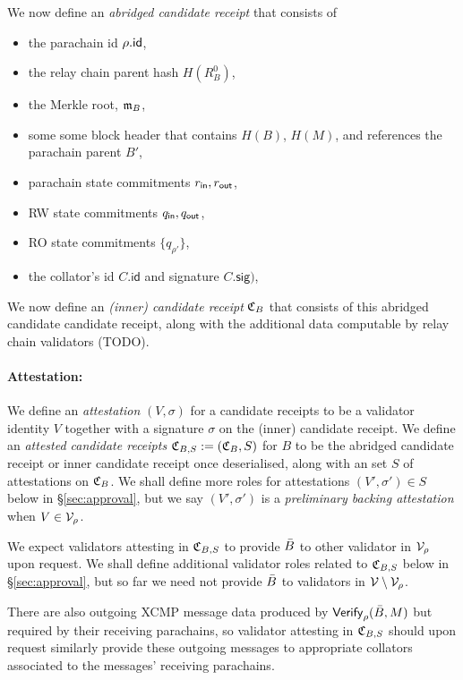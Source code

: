 We now define an {\em abridged candidate receipt} that consists of 
\begin{itemize}
\item the parachain id $\rho.\mathsf{id}$,
\item the relay chain parent hash $H(R^0_B)$, 
\item the Merkle root, $\mathfrak{m}_B$,
\item some some block header that contains $H(B)$, $H(M)$, and references the parachain parent $B'$,
\item parachain state commitments $r_{\mathsf{in}},r_{\mathsf{out}}$, 
\item RW state commitments $q_{\mathsf{in}},q_{\mathsf{out}}$,
\item RO state commitments $\{ q_{\rho'} \}$,
\item the collator's id $C.\mathsf{id}$ and signature $C.\mathsf{sig})$,
\end{itemize}

We now define an {\em (inner) candidate receipt} $\mathfrak{C}_B$ that consists of this abridged candidate candidate receipt, along with the additional data computable by relay chain validators (TODO).

\smallskip\paragraph{Attestation:}

We define an {\em attestation} $(V,\sigma)$ for a candidate receipts to be a validator identity $V$ together with a signature $\sigma$ on the (inner) candidate receipt.  We define an {\em attested candidate receipts} $\mathfrak{C}_{B,S} := (\mathfrak{C}_B,S)$ for $B$ to be the abridged candidate receipt or inner candidate receipt once deserialised, along with an set $S$ of attestations on $\mathfrak{C}_B$.  We shall define more roles for attestations $(V',\sigma') \in S$ below in \S\ref{sec:approval}, but we say $(V',\sigma')$ is a {\em preliminary backing attestation} when $V \in \mathcal{V}_{\rho}$. 

We expect validators attesting in $\mathfrak{C}_{B,S}$ to provide $\bar{B}$ to other validator in $\mathcal{V}_{\rho}$ upon request.  We shall define additional validator roles related to $\mathfrak{C}_{B,S}$ below in \S\ref{sec:approval}, but so far we need not provide $\bar{B}$ to validators in $\mathcal{V} \setminus \mathcal{V}_{\rho}$.

There are also outgoing XCMP message data produced by $\mathsf{Verify}_{\rho}(\bar{B},M)$ but required by their receiving parachains, so validator attesting in $\mathfrak{C}_{B,S}$ should upon request similarly provide these outgoing messages to appropriate collators associated to the messages' receiving parachains. 

